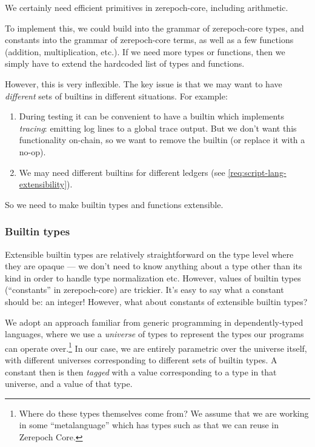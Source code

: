 We certainly need efficient primitives in \gls{zerepoch-core}, including arithmetic.

To implement this, we could build  into the grammar of \gls{zerepoch-core} types, and  constants into the grammar of \gls{zerepoch-core} terms, as well as a few functions (addition, multiplication, etc.).
If we need more types or functions, then we simply have to extend the hardcoded list of types and functions.

However, this is very inflexible.
The key issue is that we may want to have \emph{different} sets of builtins in different situations.
For example:
\begin{enumerate}
\item
  During testing it can be convenient to have a builtin which implements \emph{tracing}: emitting log lines to a global trace output.
  But we don't want this functionality on-chain, so we want to remove the builtin (or replace it with a no-op).
\item
  We may need different builtins for different ledgers (see \cref{req:script-lang-extensibility}).
\end{enumerate}

So we need to make builtin types and functions extensible.

\subsubsection{Builtin types}

Extensible builtin types are relatively straightforward on the type level where they are opaque --- we don't need to know anything about a type other than its kind in order to handle type normalization etc.
However, values of builtin types (``constants'' in \gls{zerepoch-core}) are trickier.
It's easy to say what a  constant should be: an integer!
However, what about constants of extensible builtin types?

We adopt an approach familiar from generic programming in dependently-typed languages, where we use a \emph{universe} of types to represent the types our programs can operate over.\footnote{
  Where do these types themselves come from?
  We assume that we are working in some ``metalanguage'' which has types such as  that we can reuse in Zerepoch Core.
}
In our case, we are entirely parametric over the universe itself, with different universes corresponding to different sets of builtin types.
A constant then is then \emph{tagged} with a value corresponding to a type in that universe, and a value of that type.

